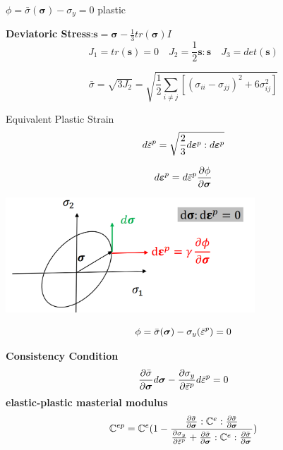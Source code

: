 \documentclass[landscape,a0paper,fontscale=0.285]{baposter} %
\begin{document}
\begin{poster}
{$\phi = \bar \sigma(\boldsymbol\sigma) - \sigma_y = 0$ plastic

\textbf{Deviatoric Stress}:$\boldsymbol s = \boldsymbol\sigma - \frac{1}{3}tr(\boldsymbol\sigma)I$
\vspace{-0.3cm}
$$
J_1 = tr(\boldsymbol s) = 0\quad J_2 = \frac{1}{2}\boldsymbol s:\boldsymbol s \quad J_3 = det(\boldsymbol s)
$$

\colorbox[HTML]{CCFFFF}{}

$$
\bar\sigma = \sqrt{3J_2} = \sqrt{\frac{1}{2}\sum_{i\neq j}[(\sigma_{ii}-\sigma_{jj})^2 + 6\sigma_{ij}^2]  }
$$

Equivalent Plastic Strain\vspace{-0.3cm}
$$\vspace{-0.3cm}
d\bar \varepsilon^p = \sqrt{\frac{2}{3}d\boldsymbol\varepsilon^p : d\boldsymbol\varepsilon^p}
$$

\colorbox[HTML]{CCFFFF}{}\vspace{-0.2cm}
$$\vspace{-0.6cm}
d\boldsymbol \varepsilon^p = d\bar \varepsilon^p\frac{\partial \phi}{\partial \boldsymbol\sigma}
$$
\begin{center}
\includegraphics[width=0.7\textwidth]{figures/ETHz_AFEA_FEM_Elasto_Plastic_normal.png}
\end{center}


\colorbox[HTML]{CCFFFF}{}\vspace{-0.3cm}
$$\vspace{-0.3cm}
\phi = \bar\sigma(\boldsymbol\sigma) - \sigma_y(\bar \varepsilon^p) = 0
$$

\textbf{Consistency Condition}\vspace{-0.3cm}
$$\vspace{-0.3cm}
\frac{\partial \bar \sigma}{\partial \boldsymbol \sigma}d\boldsymbol \sigma - \frac{\partial \sigma_y}{\partial \bar\varepsilon^p}d\bar\varepsilon^p = 0
$$
\textbf{elastic-plastic masterial modulus}\vspace{-0.3cm}
$$\vspace{-0.3cm}
 \mathbb C^{ep} = \mathbb C^e(1-\frac{\frac{\partial \bar\sigma}{\partial \boldsymbol \sigma}:\mathbb C^e: \frac{\partial \bar \sigma}{\partial \boldsymbol \sigma}}{\frac{\partial \sigma_y}{\partial \bar \varepsilon^p}+\frac{\partial \bar\sigma}{\partial \boldsymbol \sigma}:\mathbb C^e: \frac{\partial \bar \sigma}{\partial \boldsymbol \sigma}})
$$

}
\end{poster}
\end{document}
